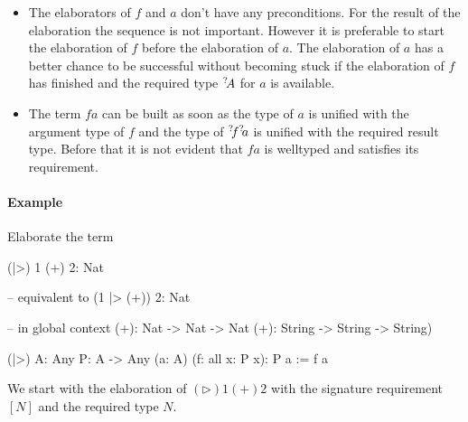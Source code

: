 \begin{itemize}
    \item The elaborators of $f$ and $a$ don't have any preconditions. For the
        result of the elaboration the sequence is not important. However it is
        preferable to start the elaboration of $f$ before the elaboration of
        $a$. The elaboration of $a$ has a better chance to be successful without
        becoming stuck if the elaboration of $f$ has finished and the required
        type ${{}^? \kern-0.2em A}$ for $a$ is available.

    \item The term $fa$ can be built as soon as the type of $a$ is unified with
        the argument type of $f$ and the type of ${{}^? \kern-0.2em f} {{}^? \kern-0.2em a}$ is unified
        with the required result type. Before that it is not evident that $fa$ is
        welltyped and satisfies its requirement.
\end{itemize}




\paragraph{Example}
Elaborate the term
\begin{alba}
    (|>) 1 (+) 2: Nat

    -- equivalent to
    (1 |> (+)) 2: Nat

    -- in global context
    (+): Nat -> Nat -> Nat
    (+): String -> String -> String)

    (|>) {A: Any} {P: A -> Any} (a: A) (f: all x: P x): P a
    :=
        f a
\end{alba}


We start with the elaboration of $(\triangleright) 1 (+) 2$ with the signature
requirement $[N]$ and the required type $N$.

